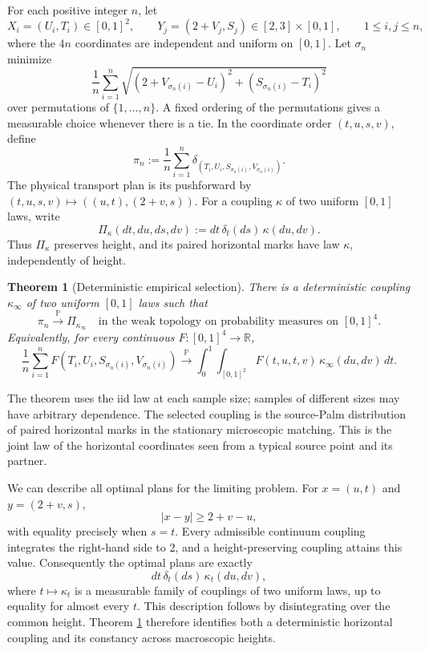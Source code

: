 \documentclass[11pt,reqno]{amsart}
\newtheorem{theorem}{Theorem}[section]
\theoremstyle{definition}
\theoremstyle{remark}
\numberwithin{equation}{section}
\newcommand{\R}{\mathbb R}
\newcommand{\Pp}{\mathbb P}
\begin{document}
For each positive integer \(n\), let
\[
X_i=(U_i,T_i)\in[0,1]^2,\qquad
Y_j=(2+V_j,S_j)\in[2,3]\times[0,1],
\qquad 1\le i,j\le n,
\]
where the \(4n\) coordinates are independent and uniform on \([0,1]\).
Let \(\sigma_n\) minimize
\begin{equation}
\frac1n\sum_{i=1}^n
\sqrt{(2+V_{\sigma_n(i)}-U_i)^2+(S_{\sigma_n(i)}-T_i)^2}
\label{eq:empirical-objective}
\end{equation}
over permutations of \(\{1,\ldots,n\}\). A fixed ordering of the
permutations gives a measurable choice whenever there is a tie.
In the coordinate order \((t,u,s,v)\), define
\begin{equation}
\pi_n:=\frac1n\sum_{i=1}^n
\delta_{(T_i,U_i,S_{\sigma_n(i)},V_{\sigma_n(i)})}.
\label{eq:empirical-plan}
\end{equation}
The physical transport plan is its pushforward by
\((t,u,s,v)\mapsto((u,t),(2+v,s))\).
For a coupling \(\kappa\) of two uniform \([0,1]\) laws, write
\[
\Pi_\kappa(dt,du,ds,dv):=dt\,\delta_t(ds)\,\kappa(du,dv).
\]
Thus \(\Pi_\kappa\) preserves height, and its paired horizontal marks
have law \(\kappa\), independently of height.

\begin{theorem}[Deterministic empirical selection]
\label{thm:main-prove}
There is a deterministic coupling \(\kappa_\infty\) of two uniform
\([0,1]\) laws such that
\begin{equation}
\pi_n\xrightarrow{\Pp}\Pi_{\kappa_\infty}
\quad\text{in the weak topology on probability measures on }[0,1]^4.
\label{eq:main-selector}
\end{equation}
Equivalently, for every continuous \(F:[0,1]^4\to\R\),
\[
\frac1n\sum_{i=1}^n
F(T_i,U_i,S_{\sigma_n(i)},V_{\sigma_n(i)})
\xrightarrow{\Pp}
\int_0^1\int_{[0,1]^2}F(t,u,t,v)\,\kappa_\infty(du,dv)\,dt.
\]
\end{theorem}

The theorem uses the iid law at each sample size; samples of different
sizes may have arbitrary dependence. The selected coupling is the
source-Palm distribution of paired horizontal marks in the stationary
microscopic matching. This is the joint law of the horizontal coordinates
seen from a typical source point and its partner.

We can describe all optimal plans for the limiting problem. For
\(x=(u,t)\) and \(y=(2+v,s)\),
\[
|x-y|\ge 2+v-u,
\]
with equality precisely when \(s=t\). Every admissible continuum
coupling integrates the right-hand side to \(2\), and a
height-preserving coupling attains this value. Consequently the optimal
plans are exactly
\begin{equation}
dt\,\delta_t(ds)\,\kappa_t(du,dv),
\label{eq:optimal-face}
\end{equation}
where \(t\mapsto\kappa_t\) is a measurable family of couplings of two
uniform laws, up to equality for almost every \(t\). This description
follows by disintegrating over the common height. Theorem
\ref{thm:main-prove} therefore identifies both a deterministic
horizontal coupling and its constancy across macroscopic heights.
\end{document}
